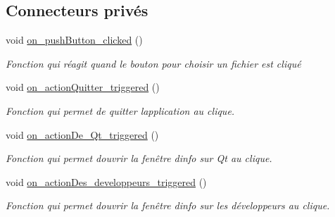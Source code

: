 \subsection*{Connecteurs privés}
\begin{DoxyCompactItemize}
\item 
void \hyperlink{classMainWindowLaunchDialog_a4464510ed5080984f0af0d3c0559f9eb}{on\+\_\+push\+Button\+\_\+clicked} ()
\begin{DoxyCompactList}\small\item\em Fonction qui réagit quand le bouton pour choisir un fichier est cliqué \end{DoxyCompactList}\item 
void \hyperlink{classMainWindowLaunchDialog_aad807a24560cbcb3d864a1c6b678537e}{on\+\_\+action\+Quitter\+\_\+triggered} ()
\begin{DoxyCompactList}\small\item\em Fonction qui permet de quitter l\textquotesingle{}application au clique. \end{DoxyCompactList}\item 
void \hyperlink{classMainWindowLaunchDialog_a91bfa59302a3591b7b3b11b03d6f9b0e}{on\+\_\+action\+De\+\_\+\+Qt\+\_\+triggered} ()
\begin{DoxyCompactList}\small\item\em Fonction qui permet d\textquotesingle{}ouvrir la fenêtre d\textquotesingle{}info sur Qt au clique. \end{DoxyCompactList}\item 
void \hyperlink{classMainWindowLaunchDialog_aaa766b56e4327b3bedf7f88c1b52cee7}{on\+\_\+action\+Des\+\_\+developpeurs\+\_\+triggered} ()
\begin{DoxyCompactList}\small\item\em Fonction qui permet d\textquotesingle{}ouvrir la fenêtre d\textquotesingle{}info sur les développeurs au clique. \end{DoxyCompactList}\end{DoxyCompactItemize}
